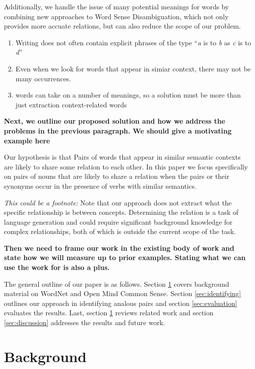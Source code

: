 \documentclass[11pt]{article}
\begin{document}
Additionally, we handle the issue of many potential meanings for words by
combining new approaches to Word Sense Disambiguation, which not only provides
more accuate relations, but can also reduce the scope of our problem. 
\begin{enumerate}
  \item Writing does not often contain explicit phrases of the type ``\emph{a}
    is to \emph{b} as \emph{c} is to \emph{d}''
  \item Even when we look for words that appear in simiar context, there  may
    not be many occurrences.
  \item words can take on a number of meanings, so a solution must be more than
    just extraction context-related words
\end{enumerate}

{\bf Next, we outline our proposed solution and how we address the problems in
  the previous paragraph.  We should give a motivating example here}  

Our hypothesis is that Pairs of words that appear in similar semantic contexts
are likely to share some relation to each other.  In this paper we focus
specifically on pairs of nouns that are likely to share a relation when the
pairs or their synonyms occur in the presence of verbs with similar semantics.  

\emph{This could be a footnote:} Note that our approach does not extract what the
specific relationship is between concepts.  Determining the relation is a task
of language generation and could require significant background knowledge for
complex relationships, both of which is outside the current scope of the task.

{\bf Then we need to frame our work in the existing body of work and state how
  we will measure up to prior examples.  Stating what we can use the work for is
  also a plus.}

The general outline of our paper is as follows.  Section \ref{sec:background}
covers background material on WordNet and Open Mind Common Sense.  Section
\ref{sec:identifying} outlines our approach in identifying analous pairs and
section \ref{sec:evaluation} evaluates the results.  Last, section
\ref{sec:background} reviews related work and section \ref{sec:discussion}
addresses the results and future work.

\section{Background}
\label{sec:background}
\end{document}

